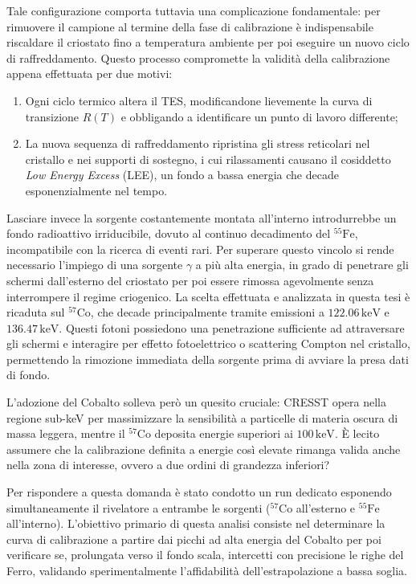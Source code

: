 Tale configurazione comporta tuttavia una complicazione fondamentale: per rimuovere il campione al termine della fase di calibrazione è indispensabile riscaldare il criostato fino a temperatura ambiente per poi eseguire un nuovo ciclo di raffreddamento. Questo processo compromette la validità della calibrazione appena effettuata per due motivi:
\begin{enumerate}
    \item Ogni ciclo termico altera il TES, modificandone lievemente la curva di transizione $R(T)$ e obbligando a identificare un punto di lavoro differente;
    \item La nuova sequenza di raffreddamento ripristina gli stress reticolari nel cristallo e nei supporti di sostegno, i cui rilassamenti causano il cosiddetto \textit{Low Energy Excess} (LEE), un fondo a bassa energia che decade esponenzialmente nel tempo.
\end{enumerate}
Lasciare invece la sorgente costantemente montata all'interno introdurrebbe un fondo radioattivo irriducibile, dovuto al continuo decadimento del $^{55}\text{Fe}$, incompatibile con la ricerca di eventi rari.
Per superare questo vincolo si rende necessario l'impiego di una sorgente $\gamma$ a più alta energia, in grado di penetrare gli schermi dall'esterno del criostato per poi essere rimossa agevolmente senza interrompere il regime criogenico. La scelta effettuata e analizzata in questa tesi è ricaduta sul $^{57}\text{Co}$, che decade principalmente tramite emissioni a $122.06\,\text{keV}$ e $136.47\,\text{keV}$. Questi fotoni possiedono una penetrazione sufficiente ad attraversare gli schermi e interagire per effetto fotoelettrico o scattering Compton nel cristallo, permettendo la rimozione immediata della sorgente prima di avviare la presa dati di fondo.

L'adozione del Cobalto solleva però un quesito cruciale: CRESST opera nella regione sub-keV per massimizzare la sensibilità a particelle di materia oscura di massa leggera, mentre il $^{57}\text{Co}$ deposita energie superiori ai $100\,\text{keV}$. È lecito assumere che la calibrazione definita a energie così elevate rimanga valida anche nella zona di interesse, ovvero a due ordini di grandezza inferiori?

Per rispondere a questa domanda è stato condotto un run dedicato esponendo simultaneamente il rivelatore a entrambe le sorgenti ($^{57}\text{Co}$ all'esterno e $^{55}\text{Fe}$ all'interno). L'obiettivo primario di questa analisi consiste nel determinare la curva di calibrazione a partire dai picchi ad alta energia del Cobalto per poi verificare se, prolungata verso il fondo scala, intercetti con precisione le righe del Ferro, validando sperimentalmente l'affidabilità dell'estrapolazione a bassa soglia.

